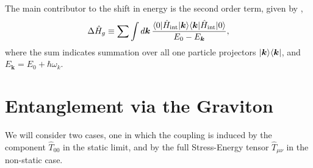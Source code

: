 \documentclass[11pt]{article}
\DeclarePairedDelimiter\bra{\langle}{\rvert}
\DeclarePairedDelimiter\ket{\lvert}{\rangle}
\newcommand{\munu}{\mu\nu}
\newcommand{\Hint}{\hat{H}_{\text{int}}}
\begin{document}
The main contributor to the shift in energy is the second order term, given by \cite{Bose_2022},
\begin{equation}
    \Delta \hat{H}_{g} \equiv \sum \int d\bm{k} \,\frac{\bra{0}\Hint\ket{\bm{k}}\bra{\bm{k}}\Hint\ket{0}}{E_0 - E_{\bm{k}}},
    \label{eq: GenShiftHg}
\end{equation}
where the sum indicates summation over all one particle projectors $\ket{\bm{k}}\bra{\bm{k}}$, and $E_{\bm{k}} = E_0 + \hbar\omega_k$.
\section{Entanglement via the Graviton}
We will consider two cases, one in which the coupling is induced by the component $\hat{T}_{00}$ in the static limit, and by the full Stress-Energy tensor $\hat{T}_{\munu}$ in the non-static case.
\end{document}
